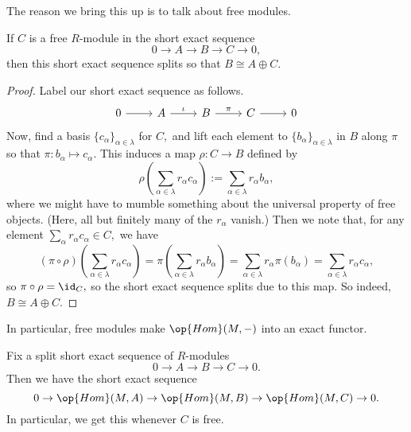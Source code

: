 The reason we bring this up is to talk about free modules.
\begin{proposition} \label{prop:freeimpliessplit}
	If $C$ is a free $R$-module in the short exact sequence
	\[0\to A\to B\to C\to 0,\]
	then this short exact sequence splits so that $B\cong A\oplus C.$
\end{proposition}
\begin{proof}
	Label our short exact sequence as follows.
	\[\begin{tikzcd}
		0 & A & B & C & 0
		\arrow[from=1-1, to=1-2]
		\arrow["\iota", from=1-2, to=1-3]
		\arrow["\pi", from=1-3, to=1-4]
		\arrow[from=1-4, to=1-5]
	\end{tikzcd}\]
	Now, find a basis  $\{c_\alpha\}_{\alpha\in\lambda}$ for $C,$ and lift each element to $\{b_\alpha\}_{\alpha\in\lambda}$ in $B$ along $\pi$ so that $\pi:b_\alpha\mapsto c_\alpha.$ This induces a map $\rho:C\to B$ defined by
	\[\rho\left(\sum_{\alpha\in\lambda}r_\alpha c_\alpha\right):=\sum_{\alpha\in\lambda}r_\alpha b_\alpha,\]
	where we might have to mumble something about the universal property of free objects. (Here, all but finitely many of the $r_\alpha$ vanish.) Then we note that, for any element $\sum_\alpha r_\alpha c_\alpha\in C,$ we have
	\[(\pi\circ\rho)\left(\sum_{\alpha\in\lambda}r_\alpha c_\alpha\right)=\pi\left(\sum_{\alpha\in\lambda}r_\alpha b_\alpha\right)=\sum_{\alpha\in\lambda}r_\alpha\pi(b_\alpha)=\sum_{\alpha\in\lambda}r_\alpha c_\alpha,\]
	so $\pi\circ\rho=\id_C,$ so the short exact sequence splits due to this map. So indeed, $B\cong A\oplus C.$
\end{proof}
In particular, free modules make $\op{Hom}(M,-)$ into an exact functor.
\begin{proposition} \label{prop:hompreservessplit}
	Fix a split short exact sequence of $R$-modules
	\[0\to A\to B\to C\to 0.\]
	Then we have the short exact sequence
	\[0\to\op{Hom}(M,A)\to\op{Hom}(M,B)\to\op{Hom}(M,C)\to0.\]
	In particular, we get this whenever $C$ is free.
\end{proposition}
